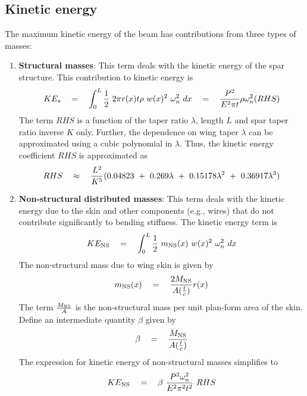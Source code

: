 \subsection{Kinetic energy}
The maximum kinetic energy of the beam has contributions from three types of masses:
\begin{enumerate}
\item \textbf{Structural masses}: This term deals with the kinetic energy of the spar structure. This contribution to kinetic energy is 
\begin{equation*}
KE_{s} \quad = \quad \int_0^L \frac{1}{2} \textrm{ } 2 \pi r(x) t \rho \textrm{ } w(x)^2 \textrm{ } \omega_n^2 \textrm{ } dx \quad = \quad \frac{P^2}{E^2 \pi t} \rho \omega_n^2 (RHS)
\end{equation*}
The term $RHS$ is a function of the taper ratio $\lambda$, length $L$ and spar taper ratio inverse $K$ only. Further, the dependence on wing taper $\lambda$ can be approximated using a cubic polynomial in $\lambda$. Thus, the kinetic energy coefficient $RHS$ is approximated as 
\begin{equation*}
RHS \quad \approx \quad \frac{L^2}{K^5} (0.04823 \textrm{ } + \textrm{ } 0.269 \lambda \textrm{ } + \textrm{ } 0.15178 \lambda^2 \textrm{ } + \textrm{ } 0.36917 \lambda^3) 
\end{equation*}
\item \textbf{Non-structural distributed masses}: This term deals with the kinetic energy due to the skin and other components (e.g., wires) that do not contribute significantly to bending stiffness. The kinetic energy term is 
\begin{equation*}
KE_{\rm NS} \quad = \quad \int_0^L \frac{1}{2} \textrm{ } m_{\rm NS}(x)  \textrm{ } w(x)^2 \textrm{ } \omega_n^2 \textrm{ } dx 
\end{equation*}
The non-structural mass due to wing skin is given by 
\begin{equation*}
m_{\rm NS}(x) \quad = \quad \frac{2 M_{\rm NS}}{A (\frac{t}{c})} r(x) 
\end{equation*}
The term $\frac{M_{\rm NS}}{A}$ is the non-structural mass per unit plan-form area of the skin. Define an intermediate quantity $\beta$ given by 
\begin{equation*}
\beta \quad = \quad \frac{M_{\rm NS}}{A (\frac{t}{c})}
\end{equation*}
The expression for kinetic energy of non-structural masses simplifies to 
\begin{equation*}
KE_{\rm NS} \quad = \quad \beta \textrm{ } \frac{P^2 \omega_n^2}{E^2 \pi^2 t^2} \textrm{ } RHS
\end{equation*}

\end{enumerate}
